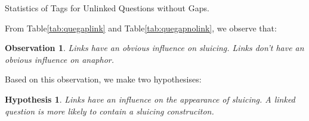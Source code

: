 \documentclass[bsc,frontabs,twoside,singlespacing,parskip,deptreport]{infthesis}     %
\newtheorem{observation}{Observation}[chapter]
\newtheorem{hypo}{Hypothesis}[chapter]
\begin{document}
\begin{minipage}{\textwidth}
\begin{minipage}[t]{0.45\textwidth}
\caption{Statistics of Tags for Unlinked Questions without Gaps.}
\label{tab:quegapnolink}

        \end{minipage}
    \end{minipage}


From Table\ref{tab:quegaplink} and Table\ref{tab:quegapnolink}, we observe that:

\begin{observation}
Links have an obvious influence on sluicing. Links don't have an obvious influence on anaphor.
\end{observation}

Based on this observation, we make two hypothesises:

\begin{hypo}
Links have an influence on the appearance of sluicing. A linked question is more likely to contain a sluicing construciton.
\end{hypo}
\end{document}
